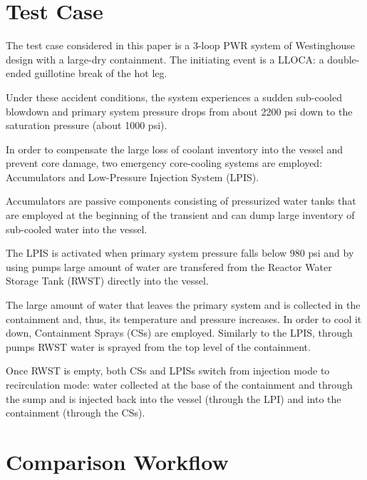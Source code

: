 \section{Test Case}
\label{sec:testCase}

The test case considered in this paper is a 3-loop PWR system of Westinghouse 
design with a large-dry containment.
The initiating event is a LLOCA: a double-ended guillotine break of the hot leg.

Under these accident conditions, the system experiences a sudden sub-cooled blowdown and 
primary system pressure drops from about 2200 psi down to the saturation pressure 
(about 1000 psi).

In order to compensate the large loss of coolant inventory into the vessel and prevent
core damage, two emergency core-cooling systems are employed: Accumulators and 
Low-Pressure Injection System (LPIS).

Accumulators are passive components consisting of pressurized water tanks that are 
employed at the beginning of the transient and can dump large inventory of sub-cooled water
into the vessel.

The LPIS is activated when primary system pressure falls below 980 psi and by using pumps
large amount of water are transfered from the Reactor Water Storage Tank (RWST) directly 
into the vessel.

The large amount of water that leaves the primary system and is collected in the containment
and, thus, its temperature and pressure increases. In order to cool it down, Containment
Sprays (CSs) are employed. Similarly to the LPIS, through pumps RWST water is sprayed from the 
top level of the containment. 

Once RWST is empty, both CSs and LPISs switch from injection mode to recirculation mode: 
water collected at the base of the containment and through the sump and is injected back 
into the vessel (through the LPI) and into the containment (through the CSs).


\section{Comparison Workflow}

